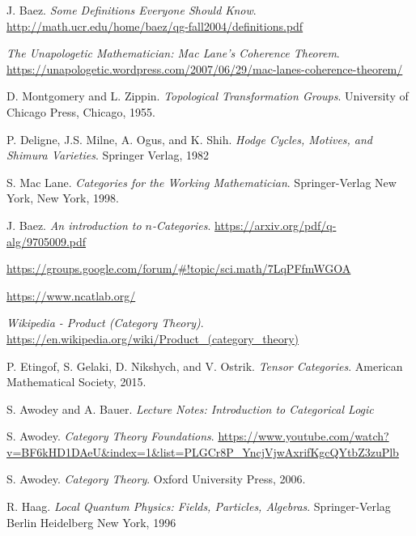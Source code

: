 \documentclass[a4paper,10pt]{scrreprt}
\theoremstyle{definition}
\theoremstyle{plain}
\theoremstyle{remark}
\begin{document}
\begin{thebibliography}{9}
   J. Baez.
    \textit{Some Definitions Everyone Should Know}.
    \url{http://math.ucr.edu/home/baez/qg-fall2004/definitions.pdf}

    \textit{The Unapologetic Mathematician: Mac Lane's Coherence Theorem}.
    \url{https://unapologetic.wordpress.com/2007/06/29/mac-lanes-coherence-theorem/}

   D. Montgomery and L. Zippin. 
    \textit{Topological Transformation Groups}.
    University of Chicago Press, Chicago, 1955.

   P. Deligne, J.S. Milne, A. Ogus, and K. Shih.
    \textit{Hodge Cycles, Motives, and Shimura Varieties}.
    Springer Verlag, 1982

   S. Mac Lane.
    \textit{Categories for the Working Mathematician}.
    Springer-Verlag New York, New York, 1998.

   J. Baez. 
    \textit{An introduction to $n$-Categories}.
    \url{https://arxiv.org/pdf/q-alg/9705009.pdf}

    \url{https://groups.google.com/forum/#!topic/sci.math/7LqPFfmWGOA}

    \url{https://www.ncatlab.org/}

    \textit{Wikipedia - Product (Category Theory)}.
    \url{https://en.wikipedia.org/wiki/Product\_(category\_theory)}

   P. Etingof, S. Gelaki, D. Nikshych, and V. Ostrik.
    \textit{Tensor Categories}.
    American Mathematical Society, 2015.

   S. Awodey and A. Bauer.
    \textit{Lecture Notes: Introduction to Categorical Logic}

   S. Awodey.
    \textit{Category Theory Foundations}.
    \url{https://www.youtube.com/watch?v=BF6kHD1DAeU&index=1&list=PLGCr8P\_YncjVjwAxrifKgcQYtbZ3zuPlb}

   S. Awodey.
    \textit{Category Theory}.
    Oxford University Press, 2006.

   R. Haag.
    \textit{Local Quantum Physics: Fields, Particles, Algebras}.
    Springer-Verlag Berlin Heidelberg New York, 1996


\end{thebibliography}
\end{document}
